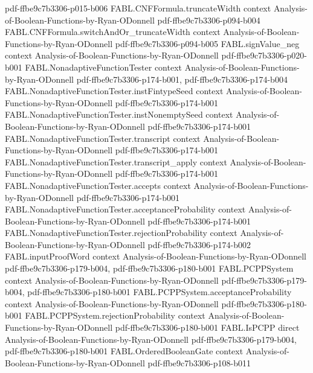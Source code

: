 \begin{theorem}
  {pdf-ffbe9c7b3306-p015-b006}
\proofstep
  {FABL.CNFFormula.truncateWidth}
  {context}
  {Analysis-of-Boolean-Functions-by-Ryan-ODonnell}
  {pdf-ffbe9c7b3306-p094-b004}
\proofstep
  {FABL.CNFFormula.switchAndOr_truncateWidth}
  {context}
  {Analysis-of-Boolean-Functions-by-Ryan-ODonnell}
  {pdf-ffbe9c7b3306-p094-b005}
\proofstep
  {FABL.signValue_neg}
  {context}
  {Analysis-of-Boolean-Functions-by-Ryan-ODonnell}
  {pdf-ffbe9c7b3306-p020-b001}
\proofstep
  {FABL.NonadaptiveFunctionTester}
  {context}
  {Analysis-of-Boolean-Functions-by-Ryan-ODonnell}
  {pdf-ffbe9c7b3306-p174-b001,
    pdf-ffbe9c7b3306-p174-b004}
\proofstep
  {FABL.NonadaptiveFunctionTester.instFintypeSeed}
  {context}
  {Analysis-of-Boolean-Functions-by-Ryan-ODonnell}
  {pdf-ffbe9c7b3306-p174-b001}
\proofstep
  {FABL.NonadaptiveFunctionTester.instNonemptySeed}
  {context}
  {Analysis-of-Boolean-Functions-by-Ryan-ODonnell}
  {pdf-ffbe9c7b3306-p174-b001}
\proofstep
  {FABL.NonadaptiveFunctionTester.transcript}
  {context}
  {Analysis-of-Boolean-Functions-by-Ryan-ODonnell}
  {pdf-ffbe9c7b3306-p174-b001}
\proofstep
  {FABL.NonadaptiveFunctionTester.transcript_apply}
  {context}
  {Analysis-of-Boolean-Functions-by-Ryan-ODonnell}
  {pdf-ffbe9c7b3306-p174-b001}
\proofstep
  {FABL.NonadaptiveFunctionTester.accepts}
  {context}
  {Analysis-of-Boolean-Functions-by-Ryan-ODonnell}
  {pdf-ffbe9c7b3306-p174-b001}
\proofstep
  {FABL.NonadaptiveFunctionTester.acceptanceProbability}
  {context}
  {Analysis-of-Boolean-Functions-by-Ryan-ODonnell}
  {pdf-ffbe9c7b3306-p174-b001}
\proofstep
  {FABL.NonadaptiveFunctionTester.rejectionProbability}
  {context}
  {Analysis-of-Boolean-Functions-by-Ryan-ODonnell}
  {pdf-ffbe9c7b3306-p174-b002}
\proofstep
  {FABL.inputProofWord}
  {context}
  {Analysis-of-Boolean-Functions-by-Ryan-ODonnell}
  {pdf-ffbe9c7b3306-p179-b004,
    pdf-ffbe9c7b3306-p180-b001}
\proofstep
  {FABL.PCPPSystem}
  {context}
  {Analysis-of-Boolean-Functions-by-Ryan-ODonnell}
  {pdf-ffbe9c7b3306-p179-b004,
    pdf-ffbe9c7b3306-p180-b001}
\proofstep
  {FABL.PCPPSystem.acceptanceProbability}
  {context}
  {Analysis-of-Boolean-Functions-by-Ryan-ODonnell}
  {pdf-ffbe9c7b3306-p180-b001}
\proofstep
  {FABL.PCPPSystem.rejectionProbability}
  {context}
  {Analysis-of-Boolean-Functions-by-Ryan-ODonnell}
  {pdf-ffbe9c7b3306-p180-b001}
\proofstep
  {FABL.IsPCPP}
  {direct}
  {Analysis-of-Boolean-Functions-by-Ryan-ODonnell}
  {pdf-ffbe9c7b3306-p179-b004,
    pdf-ffbe9c7b3306-p180-b001}
\proofstep
  {FABL.OrderedBooleanGate}
  {context}
  {Analysis-of-Boolean-Functions-by-Ryan-ODonnell}
  {pdf-ffbe9c7b3306-p108-b011}

\end{theorem}
